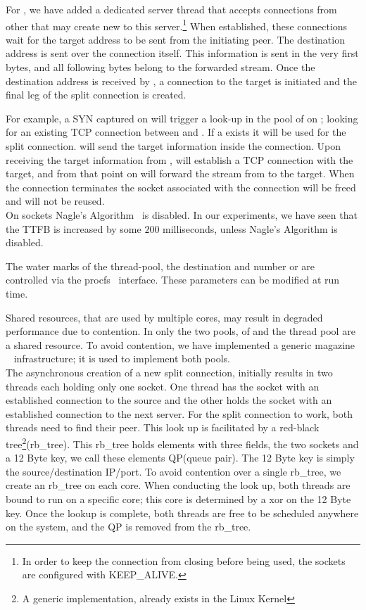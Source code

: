 For \reconns, we have added a dedicated server thread that accepts connections from other \relays that may create new \reconns to this server.\footnote{In order to keep the connection from closing before being used, the sockets are configured with KEEP\_ALIVE.}
When established, these connections wait for the target address to be sent from the initiating peer. The destination address is sent over the connection itself. This information is sent in the very first bytes, and all following bytes belong to the forwarded stream. 
Once the destination address is received by \rs , a connection to the target is initiated and the final leg of the split connection is created.

For example, a SYN captured on \rc will trigger a look-up in the pool of \reconns on \rc; looking for an existing TCP connection between \rc and \rs. If a \reconn exists it will be used for the split connection. \rc will send the target information inside the connection. Upon receiving the target information from \rc, \rs will establish a TCP connection with the target, and from that point on \rs will forward the stream from \rc to the target. When the connection terminates the socket associated with the connection will be freed and will not be reused.\\ 
 On \reconn sockets Nagle's Algorithm~\cite{nagle} is disabled. In our experiments, we have seen that the TTFB is increased by some $200$ milliseconds, unless Nagle's Algorithm is disabled.  

 The water marks of the thread-pool, the destination and number or \reconn are controlled via the procfs~\cite{proc} interface. These parameters can be modified at run time.

Shared resources, that are used by multiple cores, may result in degraded performance due to contention. In \oursys only the two pools, of \reconns and the thread pool are a shared resource. To avoid contention, we have implemented a generic magazine ~\cite{magazines} infrastructure; it is used to implement both pools.\\
The asynchronous creation of a new split connection, initially results in two threads each holding only one socket. One thread has the socket with an established connection to the source and the other holds the socket with an established connection to the next server. For the split connection to work, both threads need to find their peer. This look up is facilitated by a red-black tree\footnote{A generic implementation, already exists in the Linux Kernel}(rb\_tree). This rb\_tree holds elements with three fields, the two sockets and a 12 Byte key, we call these elements QP(queue pair). The 12 Byte key is simply the source/destination IP/port. To avoid contention over a single rb\_tree, we create an rb\_tree on each core. When conducting the look up, both threads are bound to run on a specific core; this core is determined by a xor on the 12 Byte key. Once the lookup is complete, both threads are free to be scheduled anywhere on the system, and the QP is removed from the rb\_tree. 

